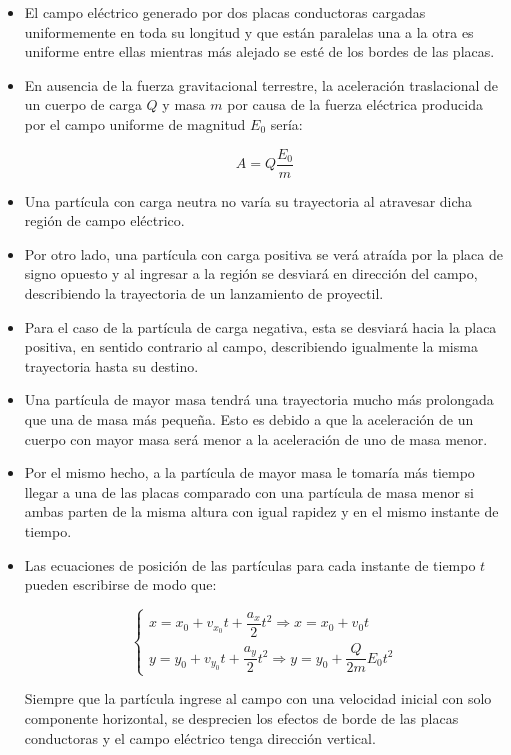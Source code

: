 \documentclass[a4paper,10pt]{article}
\begin{document}
\begin{itemize}

\item El campo el\'ectrico generado por dos placas conductoras cargadas uniformemente
en toda su longitud y que est\'an paralelas una a la otra es uniforme entre ellas mientras
m\'as alejado se est\'e de los bordes de las placas.

\item En ausencia de la fuerza gravitacional terrestre, la aceleraci\'on traslacional de un
cuerpo de carga $Q$ y masa $m$ por causa de la fuerza el\'ectrica producida por el campo
uniforme de magnitud $E_0$ ser\'ia:

\begin{equation*}
    \boxed{A=Q\frac{E_0}{m}}
\end{equation*}

\item Una partícula con carga neutra no var\'ia su trayectoria al atravesar dicha regi\'on
de campo el\'ectrico.

\item Por otro lado, una part\'icula con carga positiva se ver\'a atra\'ida por la placa de
signo opuesto y al ingresar a la regi\'on se desviar\'a en direcci\'on del campo,
describiendo la trayectoria de un lanzamiento de proyectil.

\item Para el caso de la part\'icula de carga negativa, esta se desviar\'a hacia la placa
positiva, en sentido contrario al campo, describiendo igualmente la misma trayectoria hasta
su destino.

\item Una part\'icula de mayor masa tendr\'a una trayectoria mucho m\'as prolongada que
una de masa m\'as pequeña. Esto es debido a que la aceleraci\'on de un cuerpo con mayor
masa ser\'a menor a la aceleraci\'on de uno de masa menor.

\item Por el mismo hecho, a la part\'icula de mayor masa le tomar\'ia m\'as tiempo llegar
a una de las placas comparado con una part\'icula de masa menor si ambas parten
de la misma altura con igual rapidez y en el mismo instante de tiempo.

\item Las ecuaciones de posición de las part\'iculas para cada instante de tiempo $t$ pueden
escribirse de modo que:

\begin{equation*}
    \begin{cases}
        x=x_{0}+v_{x_0}t+\dfrac{a_{x}}{2}t^2\Rightarrow x=x_{0}+v_{0}t\\
        y=y_{0}+v_{y_0}t+\dfrac{a_{y}}{2}t^2\Rightarrow y=y_{0}+\dfrac{Q}{2m}E_0t^2
    \end{cases}
\end{equation*}

Siempre que la part\'icula ingrese al campo con una velocidad inicial con solo componente
horizontal, se desprecien los efectos de borde de las placas conductoras y el campo el\'ectrico
tenga direcci\'on vertical.

\end{itemize}
\end{document}
